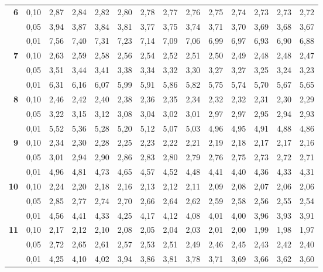 \documentclass[12pt,a4paper]{article}
\begin{document}
{\begin{longtable}{@{\extracolsep{\fill}}rrrrrrrrrrrrrr@{}}
\addlinespace[1pt]
\textbf{6} & 0,10 & 2,87 & 2,84 & 2,82 & 2,80 & 2,78 & 2,77 & 2,76 & 2,75 & 2,74 & 2,73 & 2,73 & 2,72 \\*
 & 0,05 & 3,94 & 3,87 & 3,84 & 3,81 & 3,77 & 3,75 & 3,74 & 3,71 & 3,70 & 3,69 & 3,68 & 3,67 \\*
 & 0,01 & 7,56 & 7,40 & 7,31 & 7,23 & 7,14 & 7,09 & 7,06 & 6,99 & 6,97 & 6,93 & 6,90 & 6,88 \\
\addlinespace[1pt]
\textbf{7} & 0,10 & 2,63 & 2,59 & 2,58 & 2,56 & 2,54 & 2,52 & 2,51 & 2,50 & 2,49 & 2,48 & 2,48 & 2,47 \\*
 & 0,05 & 3,51 & 3,44 & 3,41 & 3,38 & 3,34 & 3,32 & 3,30 & 3,27 & 3,27 & 3,25 & 3,24 & 3,23 \\*
 & 0,01 & 6,31 & 6,16 & 6,07 & 5,99 & 5,91 & 5,86 & 5,82 & 5,75 & 5,74 & 5,70 & 5,67 & 5,65 \\
\addlinespace[1pt]
\textbf{8} & 0,10 & 2,46 & 2,42 & 2,40 & 2,38 & 2,36 & 2,35 & 2,34 & 2,32 & 2,32 & 2,31 & 2,30 & 2,29 \\*
 & 0,05 & 3,22 & 3,15 & 3,12 & 3,08 & 3,04 & 3,02 & 3,01 & 2,97 & 2,97 & 2,95 & 2,94 & 2,93 \\*
 & 0,01 & 5,52 & 5,36 & 5,28 & 5,20 & 5,12 & 5,07 & 5,03 & 4,96 & 4,95 & 4,91 & 4,88 & 4,86 \\
\addlinespace[1pt]
\textbf{9} & 0,10 & 2,34 & 2,30 & 2,28 & 2,25 & 2,23 & 2,22 & 2,21 & 2,19 & 2,18 & 2,17 & 2,17 & 2,16 \\*
 & 0,05 & 3,01 & 2,94 & 2,90 & 2,86 & 2,83 & 2,80 & 2,79 & 2,76 & 2,75 & 2,73 & 2,72 & 2,71 \\*
 & 0,01 & 4,96 & 4,81 & 4,73 & 4,65 & 4,57 & 4,52 & 4,48 & 4,41 & 4,40 & 4,36 & 4,33 & 4,31 \\
\addlinespace[1pt]
\textbf{10} & 0,10 & 2,24 & 2,20 & 2,18 & 2,16 & 2,13 & 2,12 & 2,11 & 2,09 & 2,08 & 2,07 & 2,06 & 2,06 \\*
 & 0,05 & 2,85 & 2,77 & 2,74 & 2,70 & 2,66 & 2,64 & 2,62 & 2,59 & 2,58 & 2,56 & 2,55 & 2,54 \\*
 & 0,01 & 4,56 & 4,41 & 4,33 & 4,25 & 4,17 & 4,12 & 4,08 & 4,01 & 4,00 & 3,96 & 3,93 & 3,91 \\
\addlinespace[1pt]
\textbf{11} & 0,10 & 2,17 & 2,12 & 2,10 & 2,08 & 2,05 & 2,04 & 2,03 & 2,01 & 2,00 & 1,99 & 1,98 & 1,97 \\*
 & 0,05 & 2,72 & 2,65 & 2,61 & 2,57 & 2,53 & 2,51 & 2,49 & 2,46 & 2,45 & 2,43 & 2,42 & 2,40 \\*
 & 0,01 & 4,25 & 4,10 & 4,02 & 3,94 & 3,86 & 3,81 & 3,78 & 3,71 & 3,69 & 3,66 & 3,62 & 3,60 \\

\end{longtable}}
\end{document}
